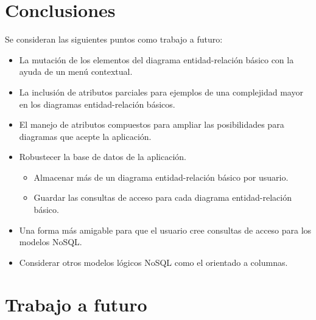 \section{Conclusiones}

Se consideran las siguientes puntos como trabajo a futuro:

\begin{itemize}
  \item La mutación de los elementos del diagrama entidad-relación básico con la ayuda de un menú contextual.
  \item La inclusión de atributos parciales para ejemplos de una complejidad mayor en los diagramas entidad-relación básicos.
  \item El manejo de atributos compuestos para ampliar las posibilidades para diagramas que acepte la aplicación.
  \item Robustecer la base de datos de la aplicación.
  \begin{itemize}
    \item Almacenar más de un diagrama entidad-relación básico por usuario.
    \item Guardar las consultas de acceso para cada diagrama entidad-relación básico.
  \end{itemize}
  \item Una forma más amigable para que el usuario cree consultas de acceso para los modelos NoSQL.
  \item Considerar otros modelos lógicos NoSQL como el orientado a columnas.
\end{itemize}

\section{Trabajo a futuro}
